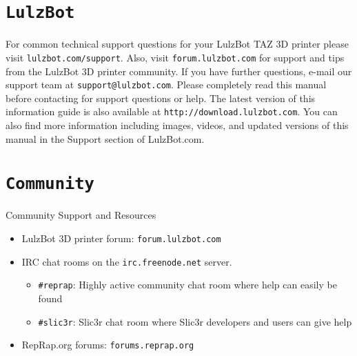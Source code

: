 %
%
%
%
%

\section{\texttt{LulzBot}}
\setlength{\parindent}{0pt}
For common technical support questions for your LulzBot\textsuperscript{\miniscule{\textregistered}} TAZ 3D printer please visit \texttt{lulzbot.com/support}. Also, visit \texttt{forum.lulzbot.com} for support and tips from the LulzBot 3D printer community. If you have further questions, e-mail our support team at \texttt{support@lulzbot.com}. Please completely read this manual before contacting for support questions or help. The latest version of this information guide is also available at \texttt{http://download.lulzbot.com}. You can also find more information including images, videos, and updated versions of this manual in the Support section of LulzBot.com.

\section{\texttt{Community}}
Community Support and Resources

\begin{itemize}

\item LulzBot 3D printer forum: \texttt{forum.lulzbot.com}
\item IRC chat rooms on the \texttt{irc.freenode.net} server.
	\begin{itemize}
	\item \texttt{\#reprap}: Highly active community chat room where help can easily be found
	\item \texttt{\#slic3r}: Slic3r chat room where Slic3r developers and users can give help
	\end{itemize}
\item RepRap.org forums: \texttt{forums.reprap.org}

\end{itemize}

